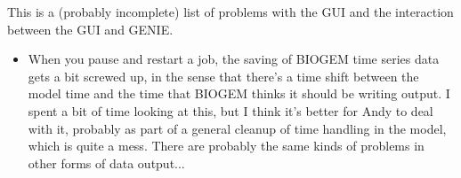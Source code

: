 \documentclass[a4paper,11pt,article]{memoir}
\begin{document}
This is a (probably incomplete) list of problems with the GUI and the
interaction between the GUI and GENIE.

\begin{itemize}
  \item{When you pause and restart a job, the saving of BIOGEM time
    series data gets a bit screwed up, in the sense that there's a
    time shift between the model time and the time that BIOGEM thinks
    it should be writing output.  I spent a bit of time looking at
    this, but I think it's better for Andy to deal with it, probably
    as part of a general cleanup of time handling in the model, which
    is quite a mess.  There are probably the same kinds of problems in
    other forms of data output...}
\end{itemize}
\end{document}
